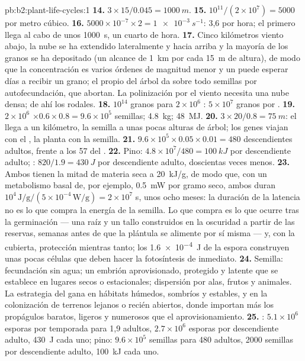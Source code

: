 \begin{solution}{pb:b2:plant-life-cycles:1}
\textbf{14.} $3\times 15/0.045 = \qty{1000}{m}$.
\textbf{15.} $10^{11}/(2\times 10^{7}) = \num{5000}$ por metro cúbico.
\textbf{16.} $5000\times 10^{-7}\times 2 = \qty{1e-3}{s^{-1}}$: 3,6 por
hora; el primero llega al cabo de unos \qty{1000}{s}, un cuarto de hora.
\textbf{17.} Cinco kilómetros viento abajo, la nube se ha extendido
lateralmente y hacia arriba y la mayoría de los granos se ha depositado
(un alcance de \qty{1}{km} por cada \qty{15}{m} de altura), de modo que la
concentración es varios órdenes de magnitud menor y un  puede
esperar días a recibir un grano; el propio  del árbol da sobre todo
semillas por autofecundación, que abortan. La polinización por el viento
necesita una nube densa; de ahí los rodales.
\textbf{18.} $10^{14}$ granos para $2\times 10^{6}$ : $5\times
10^{7}$ granos por .
\textbf{19.} $2\times 10^{6}$  $\times 0.6\times 0.8 = 9.6\times
10^{5}$ semillas; \qty{4.8}{kg}; \qty{48}{MJ}.
\textbf{20.} $3\times 20/0.8 = \qty{75}{m}$: el  llega a un
kilómetro, la semilla a unas pocas alturas de árbol; los genes viajan con
el , la planta con la semilla.
\textbf{21.} $9.6\times 10^{5}\times 0.05\times 0.01 = 480$ descendientes
adultos, frente a los 57 del .
\textbf{22.} Pino: $4.8\times 10^{7}/480 = \qty{100}{kJ}$ por descendiente
adulto; : $820/1.9 = \qty{430}{J}$ por descendiente adulto,
doscientas veces menos.
\textbf{23.} Ambos tienen la mitad de materia seca a \qty{20}{kJ/g}, de
modo que, con un metabolismo basal de, por ejemplo, \qty{0.5}{mW} por
gramo seco, ambos duran $10^{4}\,
\text{J/g}/(5\times 10^{-4}\,\text{W/g}) = 2\times 10^{7}$ s, unos
ocho meses: la duración de la latencia no es lo que compra la energía de
la semilla. Lo que compra es lo que ocurre tras la germinación --- una
raíz y un tallo construidos en la oscuridad a partir de las reservas,
semanas antes de que la plántula se alimente por sí misma --- y, con la
cubierta, protección mientras tanto; los \qty{1.6e-4}{J} de la espora
construyen unas pocas células que deben hacer la fotosíntesis de
inmediato.
\textbf{24.} Semilla: fecundación sin agua; un embrión aprovisionado,
protegido y latente que se establece en lugares secos o estacionales;
dispersión por alas, frutos y animales. La estrategia del  gana
en hábitats húmedos, sombríos y estables, y en la colonización de
terrenos lejanos o recién abiertos, donde importan más los propágulos
baratos, ligeros y numerosos que el aprovisionamiento.
\textbf{25.} : $5.1\times 10^{6}$ esporas por temporada para 1,9
adultos, $2.7\times 10^{6}$ esporas por descendiente adulto, \qty{430}{J}
cada uno; pino: $9.6\times 10^{5}$ semillas para 480 adultos, \num{2000}
semillas por descendiente adulto, \qty{100}{kJ} cada uno.
\end{solution}
